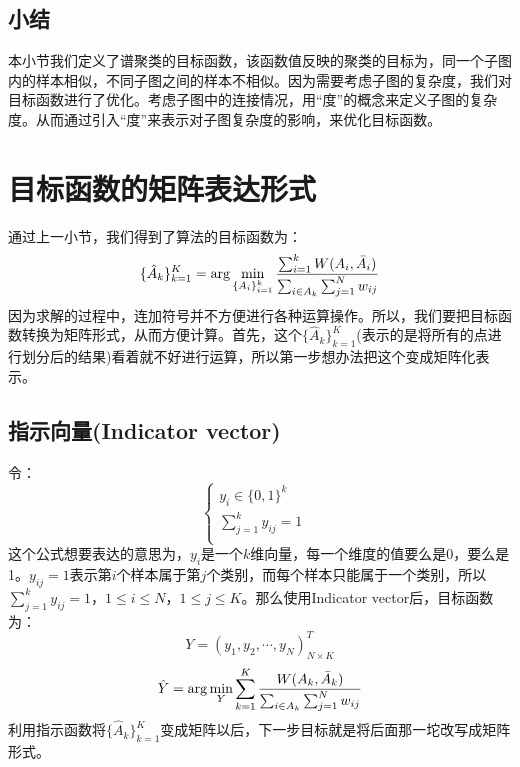 \documentclass[a4paper]{article}
\begin{document}
\subsection{小结}
本小节我们定义了谱聚类的目标函数，该函数值反映的聚类的目标为，同一个子图内的样本相似，不同子图之间的样本不相似。因为需要考虑子图的复杂度，我们对目标函数进行了优化。考虑子图中的连接情况，用“度”的概念来定义子图的复杂度。从而通过引入“度”来表示对子图复杂度的影响，来优化目标函数。

\section{目标函数的矩阵表达形式}
通过上一小节，我们得到了算法的目标函数为：
\begin{equation}
    \{ \hat{A}_k \}_{k=1}^K = \arg\min_{\{A_i\}_{i=1}^k} \frac{\sum_{i=1}^k W(A_i,\Bar{A}_i)}{\sum_{i\in A_k} \sum_{j=1}^N w_{ij}}  
\end{equation}
因为求解的过程中，连加符号并不方便进行各种运算操作。所以，我们要把目标函数转换为矩阵形式，从而方便计算。首先，这个$\{ \hat{A}_k \}_{k=1}^K$(表示的是将所有的点进行划分后的结果)看着就不好进行运算，所以第一步想办法把这个变成矩阵化表示。
\subsection{指示向量(Indicator vector)}
令：
$$
\left\{
\begin{array}{ll}
      y_i \in \{0,1\}^k & \\
      \sum_{j=1}^k y_{ij} = 1 & \\
\end{array}
\right.
$$
这个公式想要表达的意思为，$y_i$是一个$k$维向量，每一个维度的值要么是0，要么是1。$y_{ij} = 1$表示第$i$个样本属于第$j$个类别，而每个样本只能属于一个类别，所以$\sum_{j=1}^k y_{ij} = 1$，$1\leq i \leq N$，$1\leq j \leq K$。那么使用Indicator vector后，目标函数为：
$$
Y = (y_1,y_2,\cdots,y_N)^T_{N\times K}
$$
$$
\hat{Y} = \arg\min_{Y} \sum_{k=1}^K \frac{ W(A_k,\Bar{A}_k)}{\sum_{i\in A_k} \sum_{j=1}^N w_{ij}} 
$$
利用指示函数将$\{ \hat{A}_k \}_{k=1}^K$变成矩阵以后，下一步目标就是将后面那一坨改写成矩阵形式。
\end{document}
